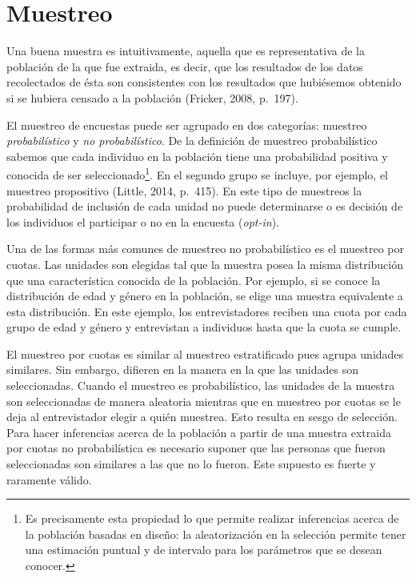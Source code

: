 \documentclass[]{article}
\let\rmarkdownfootnote\footnote%
\def\footnote{\protect\rmarkdownfootnote}
\begin{document}
\section{Muestreo}\label{muestreo}

Una buena muestra es intuitivamente, aquella que es representativa de la
población de la que fue extraida, es decir, que los resultados de los
datos recolectados de ésta son consistentes con los resultados que
hubiésemos obtenido si se hubiera censado a la población (Fricker, 2008,
p.~197).

El muestreo de encuestas puede ser agrupado en dos categorías: muestreo
\emph{probabilístico} y \emph{no probabilístico}. De la definición de
muestreo probabilístico sabemos que cada individuo en la población tiene
una probabilidad positiva y conocida de ser seleccionado\footnote{Es
  precisamente esta propiedad lo que permite realizar inferencias acerca
  de la población basadas en diseño: la aleatorización en la selección
  permite tener una estimación puntual y de intervalo para los
  parámetros que se desean conocer.}. En el segundo grupo se incluye,
por ejemplo, el muestreo propositivo (Little, 2014, p.~415). En este
tipo de muestreos la probabilidad de inclusión de cada unidad no puede
determinarse o es decisión de los individuos el participar o no en la
encuesta (\emph{opt-in}).

Una de las formas más comunes de muestreo no probabilístico es el
muestreo por cuotas. Las unidades son elegidas tal que la muestra posea
la misma distribución que una característica conocida de la población.
Por ejemplo, si se conoce la distribución de edad y género en la
población, se elige una muestra equivalente a esta distribución. En este
ejemplo, los entrevistadores reciben una cuota por cada grupo de edad y
género y entrevistan a individuos hasta que la cuota se cumple.

El muestreo por cuotas es similar al muestreo estratificado pues agrupa
unidades similares. Sin embargo, difieren en la manera en la que las
unidades son seleccionadas. Cuando el muestreo es probabilístico, las
unidades de la muestra son seleccionadas de manera aleatoria mientras
que en muestreo por cuotas se le deja al entrevistador elegir a quién
muestrea. Esto resulta en sesgo de selección. Para hacer inferencias
acerca de la población a partir de una muestra extraida por cuotas no
probabilística es necesario suponer que las personas que fueron
seleccionadas son similares a las que no lo fueron. Este supuesto es
fuerte y raramente válido.
\end{document}
